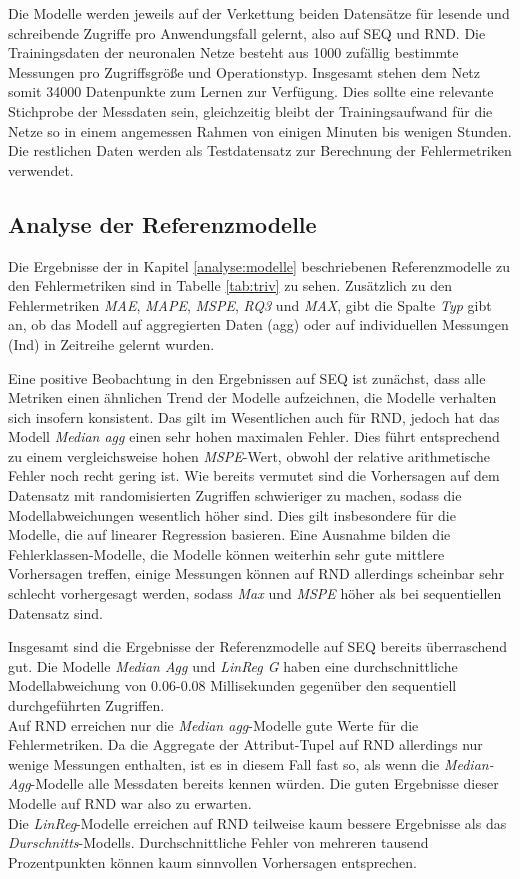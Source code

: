 \documentclass[
	12pt,
	a4paper,
	BCOR10mm,
	DIV14,
	listof=totoc,
	bibliography=totoc,
	headsepline
]{scrreprt}
\begin{document}
Die Modelle werden jeweils auf der Verkettung beiden Datensätze für lesende und schreibende Zugriffe pro Anwendungsfall gelernt, also auf SEQ und RND.
Die Trainingsdaten der neuronalen Netze besteht aus 1000 zufällig bestimmte Messungen pro Zugriffsgröße und Operationstyp. Insgesamt stehen dem Netz somit 34000 Datenpunkte zum Lernen zur Verfügung.
Dies sollte eine relevante Stichprobe der Messdaten sein, gleichzeitig bleibt der Trainingsaufwand für die Netze so in einem angemessen Rahmen von einigen Minuten bis wenigen Stunden.
Die restlichen Daten werden als Testdatensatz zur Berechnung der Fehlermetriken verwendet.

\subsection{Analyse der Referenzmodelle}
Die Ergebnisse der in Kapitel \ref{analyse:modelle} beschriebenen Referenzmodelle zu den Fehlermetriken sind in Tabelle \ref{tab:triv} zu sehen.
Zusätzlich zu den Fehlermetriken \textit{MAE}, \textit{MAPE}, \textit{MSPE}, \textit{RQ3} und \textit{MAX}, gibt die Spalte \textit{Typ} gibt an, ob das Modell auf aggregierten Daten (agg) oder auf individuellen Messungen (Ind) in Zeitreihe gelernt wurden.\medskip

Eine positive Beobachtung in den Ergebnissen auf SEQ ist zunächst, dass alle Metriken einen ähnlichen Trend der  Modelle aufzeichnen, die Modelle verhalten sich insofern konsistent.
Das gilt im Wesentlichen auch für RND, jedoch hat das Modell \textit{Median agg} einen sehr hohen maximalen Fehler. Dies führt entsprechend zu einem vergleichsweise hohen \textit{MSPE}-Wert, obwohl der relative arithmetische Fehler noch recht gering ist.
Wie bereits vermutet sind die Vorhersagen auf dem Datensatz mit randomisierten Zugriffen schwieriger zu machen, sodass die Modellabweichungen wesentlich höher sind.
Dies gilt insbesondere für die Modelle, die auf linearer Regression basieren.
Eine Ausnahme bilden die Fehlerklassen-Modelle, die Modelle können weiterhin sehr gute mittlere Vorhersagen treffen, einige Messungen können auf RND allerdings scheinbar sehr schlecht vorhergesagt werden, sodass \textit{Max} und \textit{MSPE} höher als bei sequentiellen Datensatz sind.\medskip

Insgesamt sind die Ergebnisse der Referenzmodelle auf SEQ bereits überraschend gut.
Die Modelle \textit{Median Agg} und \textit{LinReg G} haben eine durchschnittliche Modellabweichung von 0.06-0.08 Millisekunden gegenüber den sequentiell durchgeführten Zugriffen.\\
Auf RND erreichen nur die \textit{Median agg}-Modelle gute Werte für die Fehlermetriken.
Da die Aggregate der Attribut-Tupel auf RND allerdings nur wenige Messungen enthalten, ist es in diesem Fall fast so, als wenn die \textit{Median-Agg}-Modelle alle Messdaten bereits kennen würden. Die guten Ergebnisse dieser Modelle auf RND war also zu erwarten.\\
Die \textit{LinReg}-Modelle erreichen auf RND teilweise kaum bessere Ergebnisse als das \textit{Durschnitts}-Modells.
Durchschnittliche Fehler von mehreren tausend Prozentpunkten können kaum sinnvollen Vorhersagen entsprechen. \medskip
\end{document}
